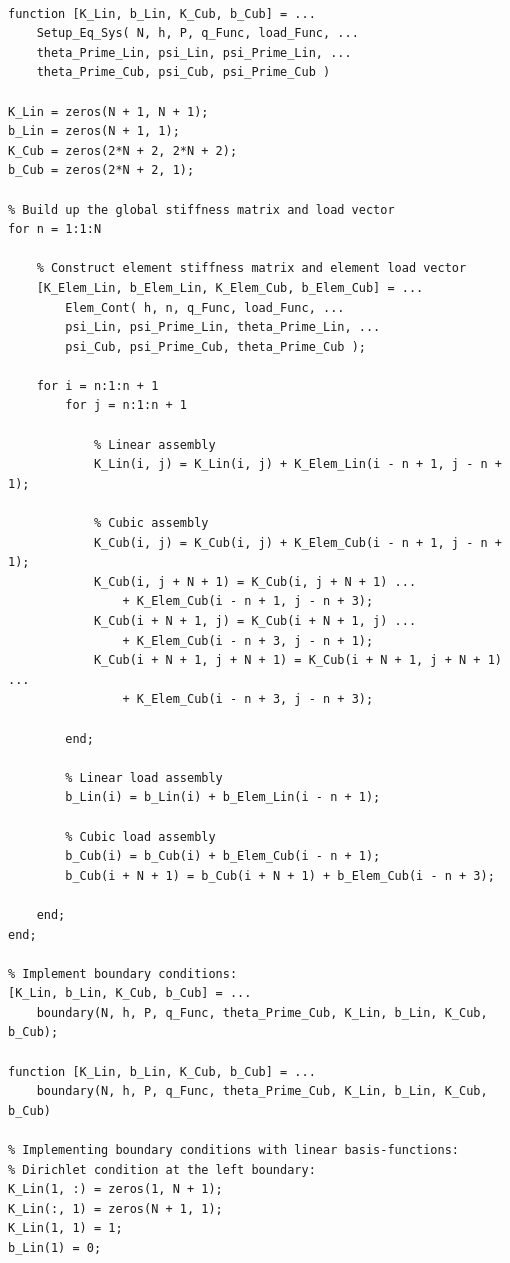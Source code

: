 \begin{lstlisting}[caption = {Setup Equation System}, label = lst:Setup_Eq_Sys]

function [K_Lin, b_Lin, K_Cub, b_Cub] = ...
    Setup_Eq_Sys( N, h, P, q_Func, load_Func, ...
    theta_Prime_Lin, psi_Lin, psi_Prime_Lin, ...
    theta_Prime_Cub, psi_Cub, psi_Prime_Cub )

K_Lin = zeros(N + 1, N + 1);
b_Lin = zeros(N + 1, 1);
K_Cub = zeros(2*N + 2, 2*N + 2);
b_Cub = zeros(2*N + 2, 1);

% Build up the global stiffness matrix and load vector
for n = 1:1:N
    
    % Construct element stiffness matrix and element load vector
    [K_Elem_Lin, b_Elem_Lin, K_Elem_Cub, b_Elem_Cub] = ...
        Elem_Cont( h, n, q_Func, load_Func, ...
        psi_Lin, psi_Prime_Lin, theta_Prime_Lin, ...
        psi_Cub, psi_Prime_Cub, theta_Prime_Cub );

    for i = n:1:n + 1
        for j = n:1:n + 1
            
            % Linear assembly
            K_Lin(i, j) = K_Lin(i, j) + K_Elem_Lin(i - n + 1, j - n + 1);
            
            % Cubic assembly
            K_Cub(i, j) = K_Cub(i, j) + K_Elem_Cub(i - n + 1, j - n + 1);
            K_Cub(i, j + N + 1) = K_Cub(i, j + N + 1) ...
                + K_Elem_Cub(i - n + 1, j - n + 3);
            K_Cub(i + N + 1, j) = K_Cub(i + N + 1, j) ...
                + K_Elem_Cub(i - n + 3, j - n + 1);
            K_Cub(i + N + 1, j + N + 1) = K_Cub(i + N + 1, j + N + 1) ...
                + K_Elem_Cub(i - n + 3, j - n + 3);
            
        end;
	 
        % Linear load assembly
        b_Lin(i) = b_Lin(i) + b_Elem_Lin(i - n + 1);

        % Cubic load assembly
        b_Cub(i) = b_Cub(i) + b_Elem_Cub(i - n + 1);
        b_Cub(i + N + 1) = b_Cub(i + N + 1) + b_Elem_Cub(i - n + 3);
        
    end;    
end;

% Implement boundary conditions:
[K_Lin, b_Lin, K_Cub, b_Cub] = ...
    boundary(N, h, P, q_Func, theta_Prime_Cub, K_Lin, b_Lin, K_Cub, b_Cub);

function [K_Lin, b_Lin, K_Cub, b_Cub] = ...
    boundary(N, h, P, q_Func, theta_Prime_Cub, K_Lin, b_Lin, K_Cub, b_Cub)

% Implementing boundary conditions with linear basis-functions:
% Dirichlet condition at the left boundary:
K_Lin(1, :) = zeros(1, N + 1);
K_Lin(:, 1) = zeros(N + 1, 1);
K_Lin(1, 1) = 1;
b_Lin(1) = 0;


\end{lstlisting}

